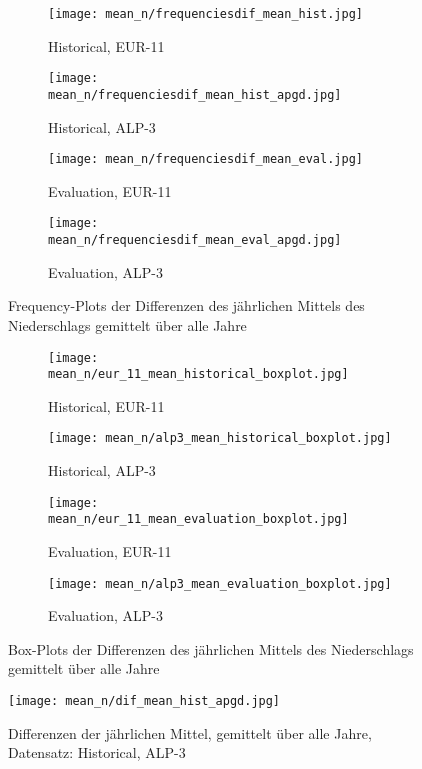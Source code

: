 \begin{figure}[h!]
	\begin{subfigure}{0.49\textwidth}
		\texttt{[image: mean\_n/frequenciesdif\_mean\_hist.jpg]}
		\caption{Historical, EUR-11}
	\end{subfigure}
	\begin{subfigure}{0.49\textwidth}
		\texttt{[image: mean\_n/frequenciesdif\_mean\_hist\_apgd.jpg]}
		\caption{Historical, ALP-3}
	\end{subfigure}
	\begin{subfigure}{0.49\textwidth}
		\texttt{[image: mean\_n/frequenciesdif\_mean\_eval.jpg]}
		\caption{Evaluation, EUR-11}
	\end{subfigure}
	\begin{subfigure}{0.49\textwidth}
		\texttt{[image: mean\_n/frequenciesdif\_mean\_eval\_apgd.jpg]}
		\caption{Evaluation, ALP-3}
	\end{subfigure}
	\caption{Frequency-Plots der Differenzen des jährlichen Mittels des Niederschlags gemittelt über alle Jahre}
	\label{fig:mean_freq_plots}
\end{figure}
\begin{figure}[h!]
	\begin{subfigure}{0.49\textwidth}
		\texttt{[image: mean\_n/eur\_11\_mean\_historical\_boxplot.jpg]}
		\caption{Historical, EUR-11}
	\end{subfigure}
	\begin{subfigure}{0.49\textwidth}
		\texttt{[image: mean\_n/alp3\_mean\_historical\_boxplot.jpg]}
		\caption{Historical, ALP-3}
	\end{subfigure}
	\begin{subfigure}{0.49\textwidth}
		\texttt{[image: mean\_n/eur\_11\_mean\_evaluation\_boxplot.jpg]}
		\caption{Evaluation, EUR-11}
	\end{subfigure}
	\begin{subfigure}{0.49\textwidth}
		\texttt{[image: mean\_n/alp3\_mean\_evaluation\_boxplot.jpg]}
		\caption{Evaluation, ALP-3}
	\end{subfigure}
	\caption{Box-Plots der Differenzen des jährlichen Mittels des Niederschlags gemittelt über alle Jahre}
	\label{fig:mean_boxplots}
\end{figure}
\begin{figure}[h]
	\texttt{[image: mean\_n/dif\_mean\_hist\_apgd.jpg]}
    \caption{Differenzen der jährlichen Mittel, gemittelt über alle Jahre, Datensatz: Historical, ALP-3}
    \label{fig:alp3_dif_hist_mean}
\end{figure}
